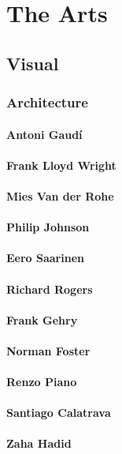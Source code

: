 \chapter{The Arts}
	\section{Visual}
		\subsection{Architecture}
		
			\subsubsection{Antoni Gaud\'{i}}
			\subsubsection{Frank Lloyd Wright}
			\subsubsection{Mies Van der Rohe}
			\subsubsection{Philip Johnson}
			\subsubsection{Eero Saarinen}
			\subsubsection{Richard Rogers}
			\subsubsection{Frank Gehry}
			\subsubsection{Norman Foster}
			\subsubsection{Renzo Piano}
			\subsubsection{Santiago Calatrava}
			\subsubsection{Zaha Hadid}
